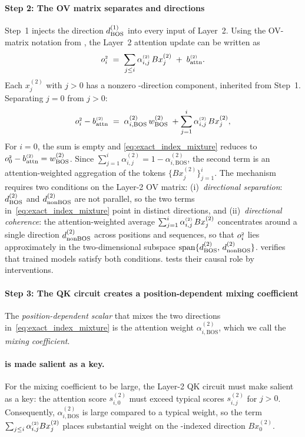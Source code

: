 \documentclass{article}
\theoremstyle{plain}
\theoremstyle{definition}
\theoremstyle{remark}
\begin{document}
\paragraph{Step 2: The OV matrix separates \bos and \nbos directions}
\label{subsec:mech_step2}
Step~1 injects the direction $d_{\text{BOS}}^{(1)}$ into every input of Layer~2. 
Using the OV-matrix notation from , the Layer~2 attention update can be written as
\begin{equation}
o_{i}^{\scriptscriptstyle 2} \;=\; \sum_{j\le i}\alpha_{i,j}^{\scriptscriptstyle (2)}\, B x_j^{(2)} \;+\; b_{\text{attn}}^{\scriptscriptstyle (2)}.
\label{eq:mech_step2_attnwrite}
\end{equation}
Each $x_j^{(2)}$ with $j>0$ has a nonzero \bos-direction component, inherited from Step~1.
Separating $j=0$ from $j>0$:
\begin{equation}
o_{i}^{\scriptscriptstyle 2}-b_{\text{attn}}^{\scriptscriptstyle (2)}
\;=\;
\alpha^{(2)}_{i,\mathrm{BOS}}\,w_{\text{BOS}}^{(2)}
\;+
\sum_{j=1}^{i}\alpha_{i,j}^{\scriptscriptstyle (2)}\,B x_j^{(2)},
\label{eq:exact_index_mixture}
\end{equation}
For $i=0$, the sum is empty and \eqref{eq:exact_index_mixture} reduces to $o_{0}^{\scriptscriptstyle 2}-b_{\text{attn}}^{\scriptscriptstyle (2)}=w_{\text{BOS}}^{(2)}$.
Since $\sum_{j=1}^{i}\alpha^{(2)}_{i,j}=1-\alpha^{(2)}_{i,\mathrm{BOS}}$, the second term is an attention-weighted aggregation of the \nbos tokens $\{Bx_j^{(2)}\}_{j=1}^{i}$.
The mechanism requires two conditions on the Layer-2 OV matrix:
(i)~\emph{directional separation}: $d_{\text{BOS}}^{(2)}$ and $d_{\text{nonBOS}}^{(2)}$ are not parallel, so the two terms in~\eqref{eq:exact_index_mixture} point in distinct directions, and
(ii)~\emph{directional coherence}: the attention-weighted average $\sum_{j=1}^{i}\alpha_{i,j}^{\scriptscriptstyle (2)}\,Bx_j^{(2)}$ concentrates around a single direction $d_{\text{nonBOS}}^{(2)}$ across positions and sequences, so that $o_{i}^{\scriptscriptstyle 2}$ lies approximately in the two-dimensional subspace $\mathrm{span}\{d_{\text{BOS}}^{(2)},\,d_{\text{nonBOS}}^{(2)}\}$.
 verifies that trained models satisfy both conditions.
 tests their causal role by interventions.

\paragraph{Step 3: The QK circuit creates a position-dependent \bos mixing coefficient}
\label{subsec:mech_step3}

The \emph{position-dependent scalar} that mixes the two directions in~\eqref{eq:exact_index_mixture} is the \bos attention weight $\alpha^{(2)}_{i,\mathrm{BOS}}$, which we call the \emph{mixing coefficient}.

\paragraph{\bos is made salient as a key.}
For the mixing coefficient to be large, the Layer-2 QK circuit must make \bos salient as a key: the \bos attention score $s_{i,0}^{(2)}$ must exceed typical \nbos scores $s_{i,j}^{(2)}$ for $j>0$.
Consequently, $\alpha^{(2)}_{i,\mathrm{BOS}}$ is large compared to a typical \nbos weight, so the term
$\sum_{j\le i}\alpha_{i,j}^{\scriptscriptstyle (2)} B x_j^{(2)}$ places substantial weight on the \bos-indexed direction $B x_0^{(2)}$.
\end{document}
